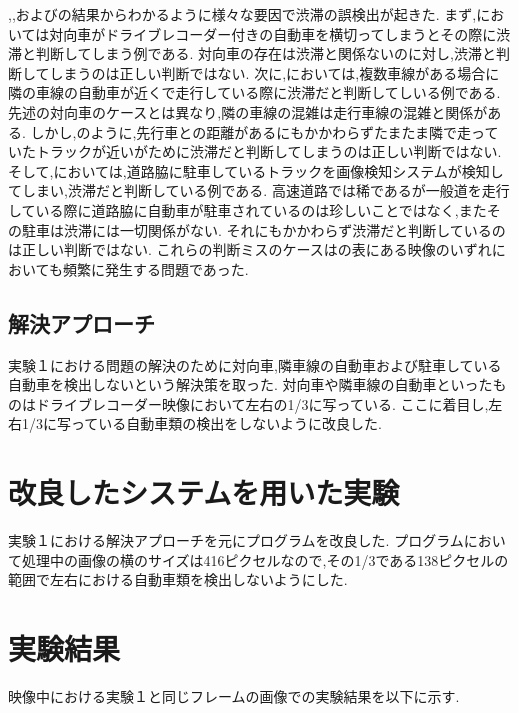 ,,およびの結果からわかるように様々な要因で渋滞の誤検出が起きた.
まず,においては対向車がドライブレコーダー付きの自動車を横切ってしまうとその際に渋滞と判断してしまう例である.
対向車の存在は渋滞と関係ないのに対し,渋滞と判断してしまうのは正しい判断ではない.
次に,においては,複数車線がある場合に隣の車線の自動車が近くで走行している際に渋滞だと判断してしいる例である.
先述の対向車のケースとは異なり,隣の車線の混雑は走行車線の混雑と関係がある.
しかし,のように,先行車との距離があるにもかかわらずたまたま隣で走っていたトラックが近いがために渋滞だと判断してしまうのは正しい判断ではない.
そして,においては,道路脇に駐車しているトラックを画像検知システムが検知してしまい,渋滞だと判断している例である.
高速道路では稀であるが一般道を走行している際に道路脇に自動車が駐車されているのは珍しいことではなく,またその駐車は渋滞には一切関係がない.
それにもかかわらず渋滞だと判断しているのは正しい判断ではない.
これらの判断ミスのケースはの表にある映像のいずれにおいても頻繁に発生する問題であった.

\subsection{解決アプローチ}
実験１における問題の解決のために対向車,隣車線の自動車および駐車している自動車を検出しないという解決策を取った.
対向車や隣車線の自動車といったものはドライブレコーダー映像において左右の1/3に写っている.
ここに着目し,左右1/3に写っている自動車類の検出をしないように改良した.

\section{改良したシステムを用いた実験}
実験１における解決アプローチを元にプログラムを改良した.
プログラムにおいて処理中の画像の横のサイズは416ピクセルなので,その1/3である138ピクセルの範囲で左右における自動車類を検出しないようにした.

\section{実験結果}
映像中における実験１と同じフレームの画像での実験結果を以下に示す.

